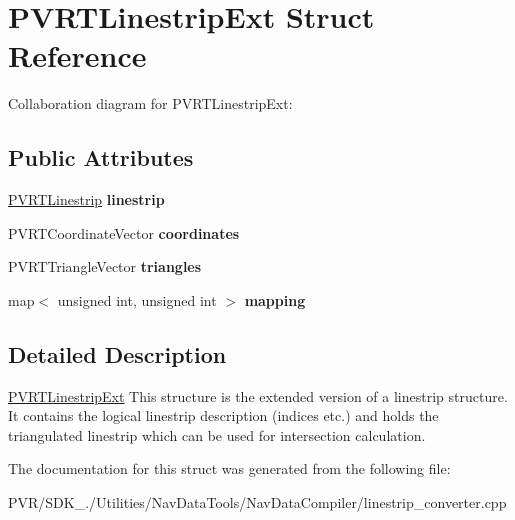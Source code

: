 \hypertarget{struct_p_v_r_t_linestrip_ext}{\section{P\+V\+R\+T\+Linestrip\+Ext Struct Reference}
\label{struct_p_v_r_t_linestrip_ext}
}


Collaboration diagram for P\+V\+R\+T\+Linestrip\+Ext\+:
\subsection*{Public Attributes}
\begin{DoxyCompactItemize}
\item 
\hypertarget{struct_p_v_r_t_linestrip_ext_a238e7b65d976a6b5fb5173a96ba8e66c}{\hyperlink{structpvrnavigation_1_1_p_v_r_t_linestrip}{P\+V\+R\+T\+Linestrip} {\bfseries linestrip}}\label{struct_p_v_r_t_linestrip_ext_a238e7b65d976a6b5fb5173a96ba8e66c}

\item 
\hypertarget{struct_p_v_r_t_linestrip_ext_a58fe45f38c437d9c4a0402a58264ba3b}{P\+V\+R\+T\+Coordinate\+Vector {\bfseries coordinates}}\label{struct_p_v_r_t_linestrip_ext_a58fe45f38c437d9c4a0402a58264ba3b}

\item 
\hypertarget{struct_p_v_r_t_linestrip_ext_a35e428d96d7fcbd3889caf1cca852980}{P\+V\+R\+T\+Triangle\+Vector {\bfseries triangles}}\label{struct_p_v_r_t_linestrip_ext_a35e428d96d7fcbd3889caf1cca852980}

\item 
\hypertarget{struct_p_v_r_t_linestrip_ext_ae9ed9ae3f5a17e36834eec6732258c2d}{map$<$ unsigned int, unsigned int $>$ {\bfseries mapping}}\label{struct_p_v_r_t_linestrip_ext_ae9ed9ae3f5a17e36834eec6732258c2d}

\end{DoxyCompactItemize}


\subsection{Detailed Description}


  \hyperlink{struct_p_v_r_t_linestrip_ext}{P\+V\+R\+T\+Linestrip\+Ext}  This structure is the extended version of a linestrip structure. It contains the logical linestrip description (indices etc.) and holds the triangulated linestrip which can be used for intersection calculation. 

The documentation for this struct was generated from the following file\+:\begin{DoxyCompactItemize}
\item 
P\+V\+R/\+S\+D\+K\+\_./\+Utilities/\+Nav\+Data\+Tools/\+Nav\+Data\+Compiler/linestrip\+\_\+converter.\+cpp\end{DoxyCompactItemize}
